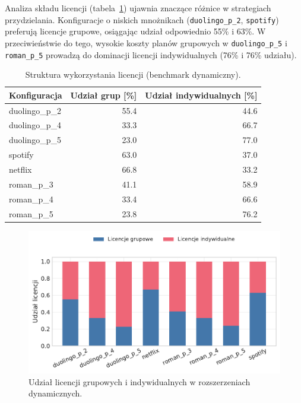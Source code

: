 Analiza składu licencji (tabela~\ref{tab:ext-dynamic-license-mix}) ujawnia znaczące różnice w strategiach przydzielania. Konfiguracje o niskich mnożnikach (\texttt{duolingo\_p\_2}, \texttt{spotify}) preferują licencje grupowe, osiągając udział odpowiednio 55\% i 63\%. W przeciwieństwie do tego, wysokie koszty planów grupowych w \texttt{duolingo\_p\_5} i \texttt{roman\_p\_5} prowadzą do dominacji licencji indywidualnych (76\% i 76\% udziału).

\begin{table}[H]
  \centering
  \caption{Struktura wykorzystania licencji (benchmark dynamiczny).}
  \label{tab:ext-dynamic-license-mix}
  \begin{tabular}{lrr}
    \toprule
    \textbf{Konfiguracja} & \textbf{Udział grup [\%]} & \textbf{Udział indywidualnych [\%]} \\
    \midrule
    duolingo\_p\_2        & 55.4                      & 44.6                                \\
    duolingo\_p\_4        & 33.3                      & 66.7                                \\
    duolingo\_p\_5        & 23.0                      & 77.0                                \\
    spotify               & 63.0                      & 37.0                                \\
    netflix               & 66.8                      & 33.2                                \\
    roman\_p\_3           & 41.1                      & 58.9                                \\
    roman\_p\_4           & 33.4                      & 66.6                                \\
    roman\_p\_5           & 23.8                      & 76.2                                \\
    \bottomrule
  \end{tabular}
\end{table}

\begin{figure}[H]
  \centering
  \includegraphics[width=0.8\linewidth]{assets/figures/extensions/dynamic/license_mix.pdf}
  \caption{Udział licencji grupowych i indywidualnych w rozszerzeniach dynamicznych.}
  \label{fig:ext-dynamic-license-mix}
\end{figure}

